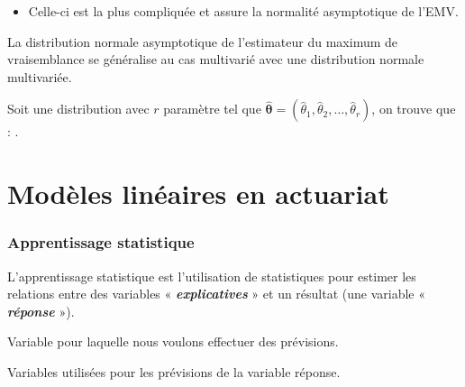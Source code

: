 \documentclass[10pt, french]{article}
\begin{document}
\begin{multicols*}{2}
\begin{definitionNOHFILLprop}
\begin{description}
		\begin{itemize}
		\item	Celle-ci est la plus compliquée et assure la normalité asymptotique de l'EMV.
		\end{itemize}
\end{description}
\end{definitionNOHFILLprop}


\begin{rappel_enhanced}[Contexte]
La distribution normale asymptotique de l'estimateur du maximum de vraisemblance se généralise au cas multivarié avec une distribution normale multivariée.
\end{rappel_enhanced}

Soit une distribution avec $r$ paramètre tel que $\hat{\bm{\theta}} = (\hat{\theta}_{1}, \hat{\theta}_{2}, \dots, \hat{\theta}_{r})$, on trouve que : .





\pagebreak
\part{Modèles linéaires en actuariat}\label{chapt:modLin}
\section{Apprentissage statistique}
\begin{definitionNOHFILL}
L'apprentissage statistique est l'utilisation de statistiques pour estimer les relations entre des variables « \textit{\textbf{explicatives}} » et un résultat (une variable « \textbf{\textit{réponse}} »). 
\end{definitionNOHFILL}

\begin{definitionNOHFILLsub}
Variable pour laquelle nous voulons effectuer des prévisions.
\end{definitionNOHFILLsub}

\begin{definitionNOHFILLsub}
Variables utilisées pour les prévisions de la variable réponse.
\end{definitionNOHFILLsub}


\end{multicols*}
\end{document}
